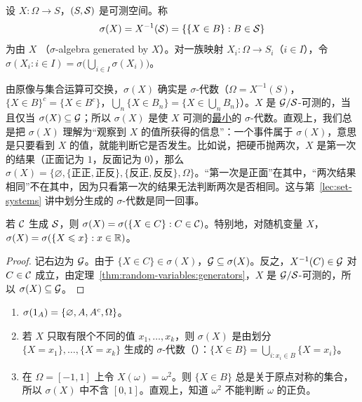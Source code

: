 
\begin{definition}\label{def:random-variables:sigma-X}
设 $X:\Omega\to S$，$(S,\mathcal{S})$ 是可测空间。称
\[
\sigma(X)=X^{-1}(\mathcal{S})=\{\{X\in B\}: B\in\mathcal{S}\}
\]
为由 $X$ （$\sigma$-algebra generated by $X$）。对一族映射 $X_i:\Omega\to S_i$（$i\in I$），令 $\sigma(X_i:i\in I)=\sigma\bigl(\bigcup_{i\in I}\sigma(X_i)\bigr)$。
\end{definition}

由原像与集合运算可交换，$\sigma(X)$ 确实是 $\sigma$-代数（$\Omega=X^{-1}(S)$，$\{X\in B\}^c=\{X\in B^c\}$，$\bigcup_n\{X\in B_n\}=\{X\in\bigcup_nB_n\}$）。$X$ 是 $\mathcal{G}/\mathcal{S}$-可测的，当且仅当 $\sigma(X)\subseteq\mathcal{G}$；所以 $\sigma(X)$ 是使 $X$ 可测的\uline{最小}的 $\sigma$-代数。直观上，我们总是把 $\sigma(X)$ 理解为“观察到 $X$ 的值所获得的信息”：一个事件属于 $\sigma(X)$，意思是只要看到 $X$ 的值，就能判断它是否发生。比如说，把硬币抛两次，$X$ 是第一次的结果（正面记为 $1$，反面记为 $0$），那么 $\sigma(X)=\{\varnothing,\{\text{正正},\text{正反}\},\{\text{反正},\text{反反}\},\Omega\}$。“第一次是正面”在其中，“两次结果相同”不在其中，因为只看第一次的结果无法判断两次是否相同。这与第~\ref{lec:set-systems} 讲中划分生成的 $\sigma$-代数是同一回事。

\begin{proposition}\label{prop:random-variables:sigma-generators}
若 $\mathcal{C}$ 生成 $\mathcal{S}$，则 $\sigma(X)=\sigma(\{X\in C\}:C\in\mathcal{C})$。特别地，对随机变量 $X$，$\sigma(X)=\sigma(\{X\leqslant x\}:x\in\mathbb{R})$。
\end{proposition}
\begin{proof}
记右边为 $\mathcal{G}$。由于 $\{X\in C\}\in\sigma(X)$，$\mathcal{G}\subseteq\sigma(X)$。反之，$X^{-1}(C)\in\mathcal{G}$ 对 $C\in\mathcal{C}$ 成立，由定理~\ref{thm:random-variables:generators}，$X$ 是 $\mathcal{G}/\mathcal{S}$-可测的，所以 $\sigma(X)\subseteq\mathcal{G}$。
\end{proof}

\begin{example}\label{ex:random-variables:sigma-examples}
\begin{enumerate}
\item $\sigma(1_A)=\{\varnothing,A,A^c,\Omega\}$。
\item 若 $X$ 只取有限个不同的值 $x_1,\dots,x_k$，则 $\sigma(X)$ 是由划分 $\{X=x_1\},\dots,\{X=x_k\}$ 生成的 $\sigma$-代数（）：$\{X\in B\}=\bigcup_{i:x_i\in B}\{X=x_i\}$。
\item 在 $\Omega=[-1,1]$ 上令 $X(\omega)=\omega^2$。则 $\{X\in B\}$ 总是关于原点对称的集合，所以 $\sigma(X)$ 中不含 $[0,1]$。直观上，知道 $\omega^2$ 不能判断 $\omega$ 的正负。
\end{enumerate}
\end{example}

